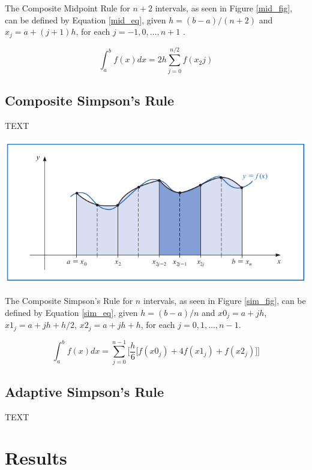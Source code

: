 \documentclass[a4paper]{article}
\begin{document}
The Composite Midpoint Rule for $n+2$ intervals, as seen in Figure \ref{mid_fig}, can be defined by Equation \ref{mid_eq}, given $h=(b-a)/(n+2)$ and $x_j=a+(j+1)h$, for each $j=-1,0,\dots,n+1$ \citep{burden2010}.

\begin{equation}
\int_{a}^b f(x) dx = 2h \sum_{j=0}^{n/2}f(x_2j)
\label{mid_eq}
\end{equation}

\subsection{Composite Simpson's Rule}\label{method:simpsons}
TEXT

\begin{center}
	\includegraphics[width=1\textwidth]{../additional/simpsons_fig.png}
	\label{sim_fig}
\end{center}

The Composite Simpson's Rule for $n$ intervals, as seen in Figure \ref{sim_fig}, can be defined by Equation \ref{sim_eq}, given $h=(b-a)/n$ and $x0_j=a+jh$, $x1_j=a+jh+h/2$, $x2_j=a+jh+h$,  for each $j=0,1,\dots,n-1$.
 
    
\begin{equation}
\int_{a}^b f(x) dx = \sum_{j=0}^{n-1} \Bigg[ \frac{h}{6} \big[ f(x0_j) + 4f(x1_j) + f(x2_j) \big] \Bigg]
\label{sim_eq}
\end{equation}



\subsection{Adaptive Simpson's Rule}\label{method:adaptive}
TEXT



\newpage
\section{Results}
\label{sec:results}
\end{document}
